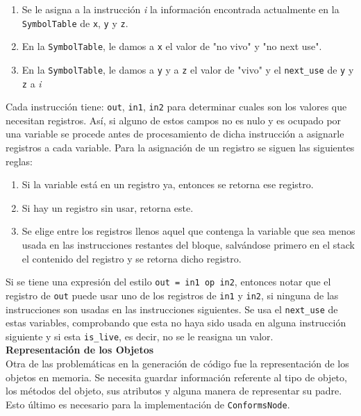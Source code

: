 \documentclass[11pt]{scrartcl} %
\begin{document}
\begin{enumerate}
	\item Se le asigna a la instrucción \textit{i} la información encontrada actualmente en la \texttt{SymbolTable} de \texttt{x}, \texttt{y} y \texttt{z}.
	\item En la \texttt{SymbolTable}, le damos a \texttt{x} el valor de "no vivo" y "no next use".
	\item En la \texttt{SymbolTable}, le damos a \texttt{y} y a \texttt{z} el valor de "vivo" y el \texttt{next\_use} de \texttt{y} y \texttt{z} a \textit{i}
\end{enumerate}

Cada instrucción tiene: \texttt{out}, \texttt{in1}, \texttt{in2} para determinar cuales son los valores que necesitan registros. Así, si alguno de estos campos no es nulo y es ocupado por una variable se procede antes de procesamiento de dicha instrucción a asignarle registros a cada variable. Para la asignación de un registro se siguen las siguientes reglas:

\begin{enumerate}
	\item Si la variable está en un registro ya, entonces se retorna ese registro.
	\item Si hay un registro sin usar, retorna este.
	\item Se elige entre los registros llenos aquel que contenga la variable que sea menos usada en las instrucciones restantes del bloque, salvándose primero en el stack el contenido del registro y se retorna dicho registro.
\end{enumerate}

Si se tiene una expresión del estilo \texttt{out = in1 op in2}, entonces notar que el registro de \texttt{out} puede usar uno de los registros de \texttt{in1} y \texttt{in2}, si ninguna de las instrucciones son usadas en las instrucciones siguientes. Se usa el \texttt{next\_use} de estas variables, comprobando que esta no haya sido usada en alguna instrucción siguiente y si esta \texttt{is\_live}, es decir, no se le reasigna un valor.\\

\textbf{Representación de los Objetos}\\

Otra de las problemáticas en la generación de código fue la representación de los objetos en memoria. Se necesita guardar información referente al tipo de objeto, los métodos del objeto, sus atributos y alguna manera de representar su padre. Esto último es necesario para la implementación de \texttt{ConformsNode}.
\end{document}
